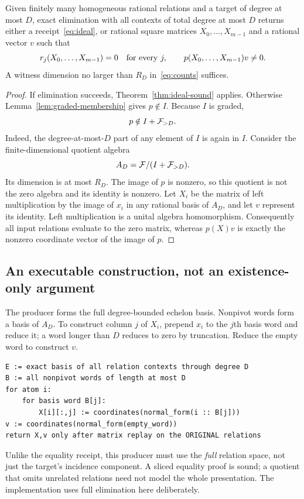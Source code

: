 \begin{theorem}\label{thm:graded-alternative}
Given finitely many homogeneous rational relations and a target of degree at
most $D$, exact elimination with all contexts of total degree at most $D$
returns either a receipt~\eqref{eq:ideal}, or rational square matrices
$X_0,\ldots,X_{m-1}$ and a rational vector $v$ such that
\[
 r_j(X_0,\ldots,X_{m-1})=0\quad\hbox{for every }j,
 \qquad p(X_0,\ldots,X_{m-1})v\ne0.
\]
A witness dimension no larger than $R_D$ in~\eqref{eq:counts} suffices.
\end{theorem}
\begin{proof}
If elimination succeeds, Theorem~\ref{thm:ideal-sound} applies. Otherwise
Lemma~\ref{lem:graded-membership} gives $p\notin I$. Because $I$ is graded,
\[
 p\notin I+\mathcal F_{>D}.
\]
Indeed, the degree-at-most-$D$ part of any element of $I$ is again in $I$.
Consider the finite-dimensional quotient algebra
\[
 A_D=\mathcal F/(I+\mathcal F_{>D}).
\]
Its dimension is at most $R_D$. The image of $p$ is nonzero, so this quotient is
not the zero algebra and its identity is nonzero. Let $X_i$ be the matrix of
left multiplication by the image of $x_i$ in any rational basis of $A_D$, and
let $v$ represent its identity. Left multiplication is a unital algebra
homomorphism. Consequently all input relations evaluate to the zero matrix,
whereas $p(X)v$ is exactly the nonzero coordinate vector of the image of $p$.
\end{proof}

\subsection{An executable construction, not an existence-only argument}

The producer forms the full degree-bounded echelon basis. Nonpivot words form a
basis of $A_D$. To construct column $j$ of $X_i$, prepend $x_i$ to the $j$th
basis word and reduce it; a word longer than $D$ reduces to zero by truncation.
Reduce the empty word to construct $v$.

\begin{lstlisting}
E := exact basis of all relation contexts through degree D
B := all nonpivot words of length at most D
for atom i:
    for basis word B[j]:
        X[i][:,j] := coordinates(normal_form(i :: B[j]))
v := coordinates(normal_form(empty_word))
return X,v only after matrix replay on the ORIGINAL relations
\end{lstlisting}

Unlike the equality receipt, this producer must use the \emph{full} relation
space, not just the target's incidence component. A sliced equality proof is
sound; a quotient that omits unrelated relations need not model the whole
presentation. The implementation uses full elimination here deliberately.


